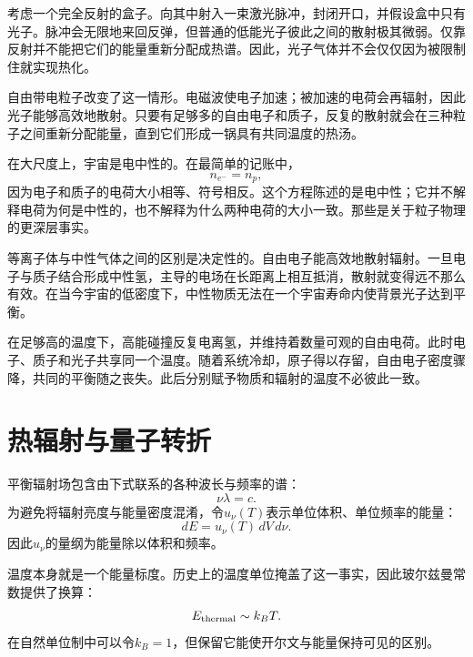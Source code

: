 考虑一个完全反射的盒子。向其中射入一束激光脉冲，封闭开口，并假设盒中只有光子。脉冲会无限地来回反弹，但普通的低能光子彼此之间的散射极其微弱。仅靠反射并不能把它们的能量重新分配成热谱。因此，光子气体并不会仅仅因为被限制住就实现热化。

自由带电粒子改变了这一情形。电磁波使电子加速；被加速的电荷会再辐射，因此光子能够高效地散射。只要有足够多的自由电子和质子，反复的散射就会在三种粒子之间重新分配能量，直到它们形成一锅具有共同温度的热汤。

在大尺度上，宇宙是电中性的。在最简单的记账中，
\begin{equation}
n_{e^-}=n_p,
\label{eq:c07-neutrality}
\end{equation}
因为电子和质子的电荷大小相等、符号相反。这个方程陈述的是电中性；它并不解释电荷为何是中性的，也不解释为什么两种电荷的大小一致。那些是关于粒子物理的更深层事实。

等离子体与中性气体之间的区别是决定性的。自由电子能高效地散射辐射。一旦电子与质子结合形成中性氢，主导的电场在长距离上相互抵消，散射就变得远不那么有效。在当今宇宙的低密度下，中性物质无法在一个宇宙寿命内使背景光子达到平衡。

在足够高的温度下，高能碰撞反复电离氢，并维持着数量可观的自由电荷。此时电子、质子和光子共享同一个温度。随着系统冷却，原子得以存留，自由电子密度骤降，共同的平衡随之丧失。此后分别赋予物质和辐射的温度不必彼此一致。

\begin{classroomqa}
\end{classroomqa}

\section{热辐射与量子转折}

平衡辐射场包含由下式联系的各种波长与频率的谱：
\begin{equation}
\nu\lambda=c.
\end{equation}
为避免将辐射亮度与能量密度混淆，令\(u_\nu(T)\)表示单位体积、单位频率的能量：
\begin{equation}
dE=u_\nu(T)\,dV\,d\nu.
\label{eq:c07-spectral-density}
\end{equation}
因此\(u_\nu\)的量纲为能量除以体积和频率。

温度本身就是一个能量标度。历史上的温度单位掩盖了这一事实，因此玻尔兹曼常数提供了换算：
\begin{equation}
E_{\rm thermal}\sim k_B T.
\end{equation}
在自然单位制中可以令\(k_B=1\)，但保留它能使开尔文与能量保持可见的区别。

